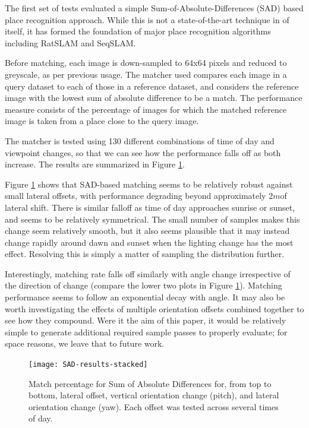 \documentclass[letterpaper, 10 pt, conference]{ieeeconf}  %
\begin{document}
The first set of tests evaluated a simple Sum-of-Absolute-Differences (SAD) based place recognition approach. While this is not a state-of-the-art technique in of itself, it has formed the foundation of major place recognition algorithms including RatSLAM and SeqSLAM. 

Before matching, each image is down-sampled to 64x64 pixels and reduced to greyscale, as per previous usage. The matcher used compares each image in a query dataset to each of those in a reference dataset, and considers the reference image with the lowest sum of absolute difference to be a match. The performance measure consists of the percentage of images for which the matched reference image is taken from a place close to the query image.

The matcher is tested using 130 different combinations of time of day and viewpoint changes, so that we can see how the performance falls off as both increase. The results are summarized in Figure \ref{fig:sad-results-stacked}.

Figure \ref{fig:sad-results-stacked} shows that SAD-based matching seems to be relatively robust against small lateral offsets, with performance degrading beyond approximately $2m$of lateral shift. There is similar falloff as time of day approaches sunrise or sunset, and seems to be relatively symmetrical. The small number of samples makes this change seem relatively smooth, but it also seems plausible that it may instead change rapidly around dawn and sunset when the lighting change has the most effect. Resolving this is simply a matter of sampling the distribution further.

Interestingly, matching rate falls off similarly with angle change irrespective of the direction of change (compare the lower two plots in Figure \ref{fig:sad-results-stacked}). Matching performance seems to follow an exponential decay with angle. It may also be worth investigating the effects of multiple orientation offsets combined together to see how they compound. Were it the aim of this paper, it would be relatively simple to generate additional required sample passes to properly evaluate; for space reasons, we leave that to future work.

\begin{figure}[ht]
    \centering
    \texttt{[image: SAD-results-stacked]}
    \caption{Match percentage for Sum of Absolute Differences for, from top to bottom, lateral offset, vertical orientation change (pitch), and lateral orientation change (yaw). Each offset was tested across several times of day.}
    \label{fig:sad-results-stacked}
\end{figure}
\end{document}
